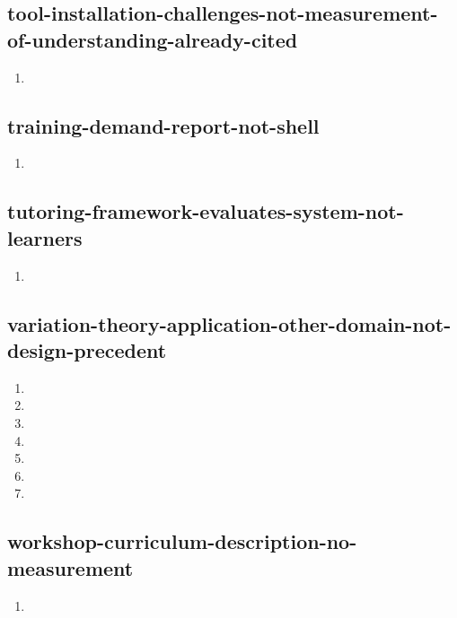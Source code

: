 \documentclass{article}
\begin{document}
\subsection{tool-installation-challenges-not-measurement-of-understanding-already-cited}
\begin{enumerate}
\item {}
\end{enumerate}

\subsection{training-demand-report-not-shell}
\begin{enumerate}
\item {}
\end{enumerate}

\subsection{tutoring-framework-evaluates-system-not-learners}
\begin{enumerate}
\item {}
\end{enumerate}

\subsection{variation-theory-application-other-domain-not-design-precedent}
\begin{enumerate}
\item {}
\item {}
\item {}
\item {}
\item {}
\item {}
\item {}
\end{enumerate}

\subsection{workshop-curriculum-description-no-measurement}
\begin{enumerate}
\item {}
\end{enumerate}
\end{document}
